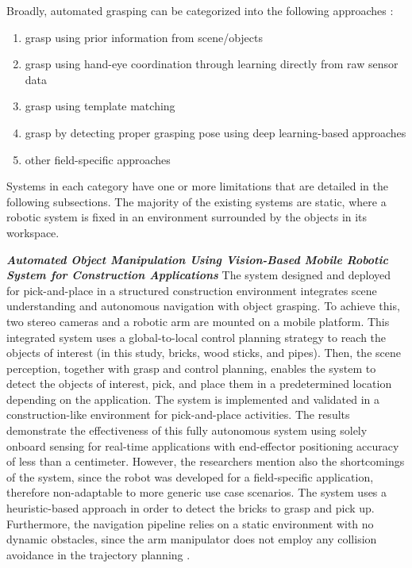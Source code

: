 Broadly, automated grasping can be categorized into the following approaches 
\cite{asadi2019construction}: 

\begin{enumerate}
	\item grasp using prior information from scene/objects
	\item grasp using hand-eye coordination through learning directly from raw sensor data
	\item grasp using template matching
	\item grasp by detecting proper grasping pose using deep learning-based approaches
	\item other field-specific approaches
\end{enumerate}

Systems in each category have one or more limitations that are detailed in the following
subsections. The majority of the existing systems are static, where a robotic system 
is fixed in an environment surrounded by the objects in its workspace.

\textbf{\textit{Automated Object Manipulation Using Vision-Based Mobile 
Robotic System for Construction Applications}} \quad
The system designed and deployed for pick-and-place in a structured construction environment
\cite{asadi2019construction} integrates scene understanding and autonomous navigation 
with object grasping. To achieve this, two stereo cameras and a robotic arm are mounted
on a mobile platform. This integrated system uses a global-to-local control planning strategy
to reach the objects of interest (in this study, bricks, wood sticks, and pipes). 
Then, the scene perception, together with grasp and control planning, enables the system
to detect the objects of interest, pick, and place them in a predetermined location depending
on the application.
The system is implemented and validated in a construction-like environment for pick-and-place
activities. The results demonstrate the effectiveness of this fully autonomous system 
using solely onboard sensing for real-time applications with end-effector positioning
accuracy of less than a centimeter.
However, the researchers mention also the shortcomings of the system, since the robot
was developed for a field-specific application, therefore non-adaptable to more generic
use case scenarios. The system uses a heuristic-based approach in order to detect the
bricks to grasp and pick up. Furthermore, the navigation pipeline relies on a static environment
with no dynamic obstacles, since the arm manipulator does not employ any collision avoidance
in the trajectory planning \cite{asadi2019construction}.


